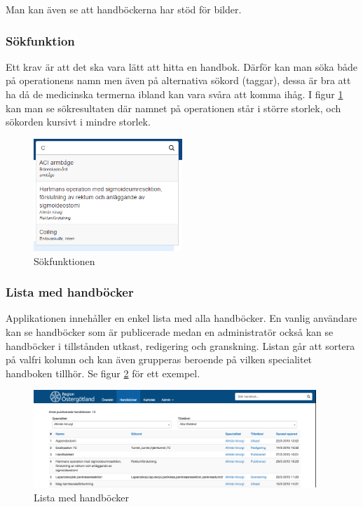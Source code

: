 Man kan även se att handböckerna har stöd för bilder.

\subsubsection{Sökfunktion}
Ett krav är att det ska vara lätt att hitta en handbok.
Därför kan man söka både på operationens namn men även på alternativa sökord (taggar), dessa är bra att ha då de medicinska termerna ibland kan vara svåra att komma ihåg.
I figur \ref{fig:search} kan man se sökresultaten där namnet på operationen står i större storlek, och sökorden kursivt i mindre storlek.

\begin{figure}[h!]
  \centering
  \includegraphics[width=0.5\textwidth]{images/site/search}
  \caption{Sökfunktionen}
  \label{fig:search}
\end{figure}


\subsubsection{Lista med handböcker}
Applikationen innehåller en enkel lista med alla handböcker. En vanlig användare kan se handböcker som är publicerade medan en administratör också kan se handböcker i tillstånden utkast, redigering och granskning. %
Listan går att sortera på valfri kolumn och kan även grupperas beroende på vilken specialitet handboken tillhör.
Se figur \ref{fig:list} för ett exempel.

\begin{figure}[h!]
  \centering
  \includegraphics[width=0.95\textwidth]{images/site/list}
  \caption{Lista med handböcker}
  \label{fig:list}
\end{figure}

